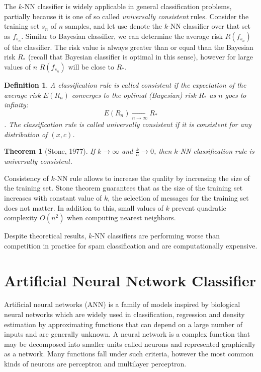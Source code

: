 \documentclass[12pt]{report}
\newtheorem{theorem}{Theorem}[section]
\newtheorem{definition}{Definition}[section]
\begin{document}
The $k$-NN classifier is widely applicable in general classification problems, partially because it is one of so called \textit{universally consistent} rules. Consider the training set $s_n$ of $n$ samples, and let use denote the $k$-NN classifier over that set as $f_{s_n}$. Similar to Bayesian classifier, we can determine the average risk $R(f_{s_n})$ of the classifier. The risk value is always greater than or equal than the Bayesian risk $R_*$ (recall that Bayesian classifier is optimal in this sense), however for large values of $n$ $R(f_{s_n})$ will be close to $R_*$.

\begin{definition}
	A classification rule is called consistent if the expectation of the average risk $E(R_n)$ converges to the optimal (Bayesian) risk $R_*$ as $n$ goes to infinity:
	$$E(R_n) \xrightarrow[n \rightarrow \infty]{} R_*$$.
	The classification rule is called universally consistent if it is consistent for any distribution of $(x, c)$.
\end{definition}

\begin{theorem}[Stone, 1977]
	If $k \rightarrow \infty$ and $\frac{k}{n} \rightarrow 0$, then $k$-NN classification rule is universally consistent.
\end{theorem}

Consistency of $k$-NN rule allows to increase the quality by increasing the size of the training set. Stone theorem guarantees that as the size of the training set increases with constant value of $k$, the selection of messages for the training set does not matter. In addition to this, small values of $k$ prevent quadratic complexity $O(n^2)$ when computing nearest neighbors.

Despite theoretical results, $k$-NN classifiers are performing worse than competition in practice for spam classification and are computationally expensive.

\newpage

\section{Artificial Neural Network Classifier}

Artificial neural networks (ANN) is a family of models inspired by biological neural networks which are widely used in classification, regression and density estimation by approximating functions that can depend on a large number of inputs and are generally unknown. A neural network is a complex function that may be decomposed into smaller units called neurons and represented graphically as a network. Many functions fall under such criteria, however the most common kinds of neurons are perceptron and multilayer perceptron.
\end{document}
